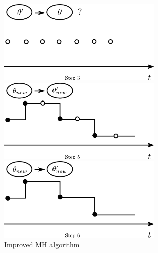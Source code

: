 \begin{figure}[H]
  \begin{minipage}[hp]{0.45\linewidth}
  \centering
    \includegraphics [width=0.70\textwidth, angle=0]{figs/plot3.pdf}
    \vspace{-0 in}
  \end{minipage}
  \begin{minipage}[hp]{0.45\linewidth}
  \centering
    \includegraphics [width=0.70\textwidth, angle=0]{figs/plot5.pdf}
    \vspace{-0 in}
  \end{minipage}
  \begin{minipage}[hp]{0.45\linewidth}
  \centering
    \includegraphics [width=0.70\textwidth, angle=0]{figs/plot6.pdf}
    \vspace{-0 in}
  \end{minipage}

    \caption{Improved MH algorithm}

  \end{figure}

